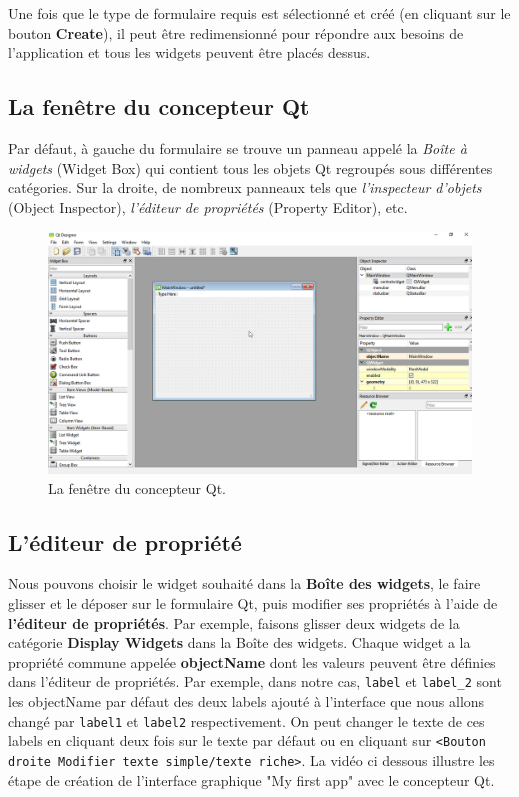 \documentclass[%
oneside,                 %
final,                   %
10pt,french]{article}
\begin{document}
Une fois que le type de formulaire requis est sélectionné et créé (en cliquant sur le bouton \textbf{Create}), il peut être redimensionné pour répondre aux besoins de l'application et tous les widgets peuvent être placés dessus.

\subsection{La fenêtre du concepteur Qt}
Par défaut, à gauche du formulaire se trouve un panneau appelé la \emph{Boîte à widgets} (Widget Box) qui contient tous les objets Qt regroupés sous différentes catégories. Sur la droite, de nombreux panneaux tels que \emph{l'inspecteur d'objets} (Object Inspector), \emph{l'éditeur de propriétés} (Property Editor), etc.


\begin{figure}[!ht]  %
  \centerline{\includegraphics[width=0.9\linewidth]{imgs/designerWindow.png}}
  \caption{
  La fenêtre du concepteur Qt. \label{fig:designerWindow}
  }
\end{figure}


\subsection{L'éditeur de propriété}

Nous pouvons choisir le widget souhaité dans la \textbf{Boîte des widgets}, le faire glisser et le déposer sur le formulaire Qt, puis modifier ses propriétés à l'aide de \textbf{l'éditeur de propriétés}. Par exemple, faisons glisser deux widgets de la catégorie \textbf{Display Widgets}  dans la Boîte des widgets. Chaque widget a la propriété commune appelée \textbf{objectName} dont les valeurs peuvent être définies dans l'éditeur de propriétés. Par exemple, dans notre cas, \texttt{label} et \Verb!label_2! sont les objectName par défaut des deux labels ajouté à l'interface que nous allons changé par \texttt{label1} et \texttt{label2} respectivement. On peut changer le texte de ces labels en cliquant deux fois sur le texte par défaut ou en cliquant sur \texttt{<Bouton droite Modifier texte simple/texte riche>}. La vidéo ci dessous illustre les étape de création de l'interface graphique "My first app" avec le concepteur Qt.
\end{document}
